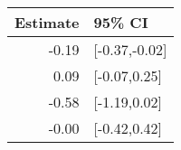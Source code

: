 \begin{tabular}{rl}
  \hline
Estimate & 95\% CI \\ 
  \hline
-0.19 & [-0.37,-0.02] \\ 
  0.09 & [-0.07,0.25] \\ 
  -0.58 & [-1.19,0.02] \\ 
  -0.00 & [-0.42,0.42] \\ 
   \hline
\end{tabular}

